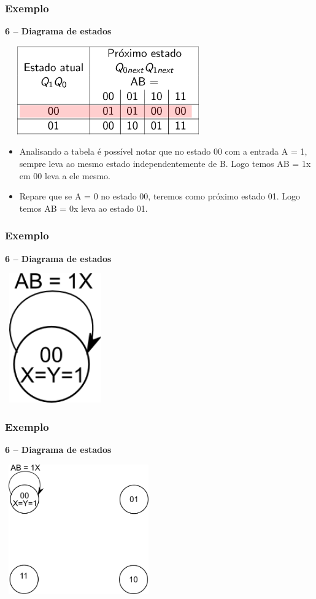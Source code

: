 \documentclass{beamer}
\begin{document}
\begin{frame}
  \frametitle{Exemplo}
  \textbf{6 – Diagrama de estados}
  \begin{center}
   \includegraphics[height = 1.5in, width = 3.5in]{Diagrama_estado_tabela.png}
  \end{center}

  \begin{itemize}
   \item Analisando a tabela é possível notar que no estado 00 com a entrada A = 1, sempre leva ao mesmo estado independentemente 
	 de B. Logo temos AB = 1x em 00 leva a ele mesmo.\pause 
   \item Repare que se A = 0 no estado 00, teremos como próximo estado 01. Logo temos AB = 0x leva ao estado 01.
  \end{itemize} 
\end{frame}

\begin{frame}
  \frametitle{Exemplo}
  \textbf{6 – Diagrama de estados}
   \begin{center}
    \includegraphics[height = 2.2in, width = 1.7in]{Diagrama_de_estado_ex1.png}
   \end{center}
\end{frame}

\begin{frame}
  \frametitle{Exemplo}
  \textbf{6 – Diagrama de estados}
   \begin{center}
    \includegraphics[height = 2.2in, width = 2.5in]{Diagrama_de_estado_ex2.png}
   \end{center}
\end{frame}
\end{document}
